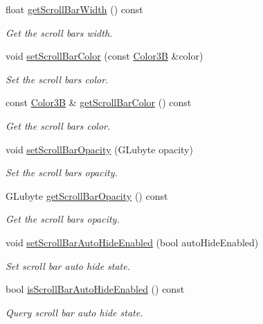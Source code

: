 \begin{DoxyCompactItemize}
float \hyperlink{classui_1_1ScrollView_a7fda1c7e75712c999b597e8ebfb84111}{get\+Scroll\+Bar\+Width} () const
\begin{DoxyCompactList}\small\item\em Get the scroll bar\textquotesingle{}s width. \end{DoxyCompactList}\item 
void \hyperlink{classui_1_1ScrollView_a8429ec3c7148b14bb8007d58473f7cb8}{set\+Scroll\+Bar\+Color} (const \hyperlink{structColor3B}{Color3B} \&color)
\begin{DoxyCompactList}\small\item\em Set the scroll bar\textquotesingle{}s color. \end{DoxyCompactList}\item 
const \hyperlink{structColor3B}{Color3B} \& \hyperlink{classui_1_1ScrollView_a276168caee41740b9ba9a3dee9ea7958}{get\+Scroll\+Bar\+Color} () const
\begin{DoxyCompactList}\small\item\em Get the scroll bar\textquotesingle{}s color. \end{DoxyCompactList}\item 
void \hyperlink{classui_1_1ScrollView_aefcd0a36405be35892b5543a841f9c04}{set\+Scroll\+Bar\+Opacity} (G\+Lubyte opacity)
\begin{DoxyCompactList}\small\item\em Set the scroll bar\textquotesingle{}s opacity. \end{DoxyCompactList}\item 
G\+Lubyte \hyperlink{classui_1_1ScrollView_a02eb90f2bfc65f72e121ebd8b5b3e290}{get\+Scroll\+Bar\+Opacity} () const
\begin{DoxyCompactList}\small\item\em Get the scroll bar\textquotesingle{}s opacity. \end{DoxyCompactList}\item 
void \hyperlink{classui_1_1ScrollView_a321ebc787e52091acd98786f3d1fad08}{set\+Scroll\+Bar\+Auto\+Hide\+Enabled} (bool auto\+Hide\+Enabled)
\begin{DoxyCompactList}\small\item\em Set scroll bar auto hide state. \end{DoxyCompactList}\item 
bool \hyperlink{classui_1_1ScrollView_a1d9ea4d596c7992679abab9e89854c1b}{is\+Scroll\+Bar\+Auto\+Hide\+Enabled} () const
\begin{DoxyCompactList}\small\item\em Query scroll bar auto hide state. \end{DoxyCompactList}\item 

\end{DoxyCompactItemize}
